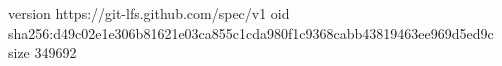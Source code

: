 version https://git-lfs.github.com/spec/v1
oid sha256:d49c02e1e306b81621e03ca855c1cda980f1c9368cabb43819463ee969d5ed9c
size 349692
